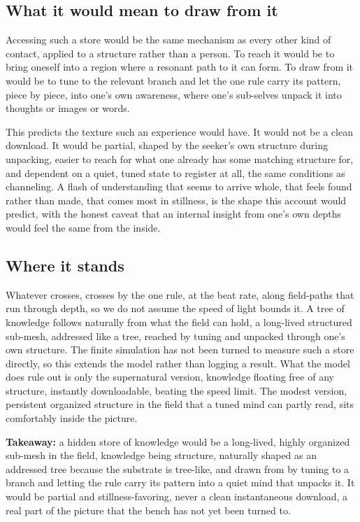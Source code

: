 \subsection{What it would mean to draw from it}

Accessing such a store would be the same mechanism as every other kind of contact, applied to a structure rather than a person. To reach it would be to bring oneself into a region where a resonant path to it can form. To draw from it would be to tune to the relevant branch and let the one rule carry its pattern, piece by piece, into one's own awareness, where one's sub-selves unpack it into thoughts or images or words.

This predicts the texture such an experience would have. It would not be a clean download. It would be partial, shaped by the seeker's own structure during unpacking, easier to reach for what one already has some matching structure for, and dependent on a quiet, tuned state to register at all, the same conditions as channeling. A flash of understanding that seems to arrive whole, that feels found rather than made, that comes most in stillness, is the shape this account would predict, with the honest caveat that an internal insight from one's own depths would feel the same from the inside.

\subsection{Where it stands}

Whatever crosses, crosses by the one rule, at the beat rate, along field-paths that run through depth, so we do not assume the speed of light bounds it. A tree of knowledge follows naturally from what the field can hold, a long-lived structured sub-mesh, addressed like a tree, reached by tuning and unpacked through one's own structure. The finite simulation has not been turned to measure such a store directly, so this extends the model rather than logging a result. What the model does rule out is only the supernatural version, knowledge floating free of any structure, instantly downloadable, beating the speed limit. The modest version, persistent organized structure in the field that a tuned mind can partly read, sits comfortably inside the picture.

\textbf{Takeaway:} a hidden store of knowledge would be a long-lived, highly organized sub-mesh in the field, knowledge being structure, naturally shaped as an addressed tree because the substrate is tree-like, and drawn from by tuning to a branch and letting the rule carry its pattern into a quiet mind that unpacks it. It would be partial and stillness-favoring, never a clean instantaneous download, a real part of the picture that the bench has not yet been turned to.
